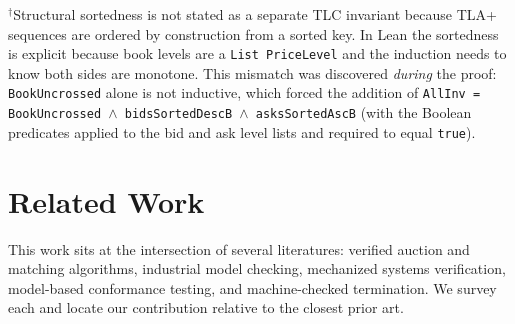 \documentclass[11pt,a4paper]{article}
\begin{document}
\begin{table}[H]
\medskip
\raggedright\footnotesize
$^\dagger$Structural sortedness is not stated as a separate TLC
invariant because TLA+ sequences are ordered by construction from a
sorted key. In Lean the sortedness is explicit because book levels are
a \texttt{List PriceLevel} and the induction needs to know both sides
are monotone. This mismatch was discovered \emph{during} the proof:
\texttt{BookUncrossed} alone is not inductive, which forced the
addition of \texttt{AllInv = BookUncrossed $\land$ bidsSortedDescB
$\land$ asksSortedAscB} (with the Boolean predicates applied to the
bid and ask level lists and required to equal \texttt{true}).
\end{table}


\section{Related Work}
\label{sec:related}

This work sits at the intersection of several literatures: verified
auction and matching algorithms, industrial model checking, mechanized
systems verification, model-based conformance testing, and
machine-checked termination. We survey each and locate our contribution
relative to the closest prior art.
\end{document}
